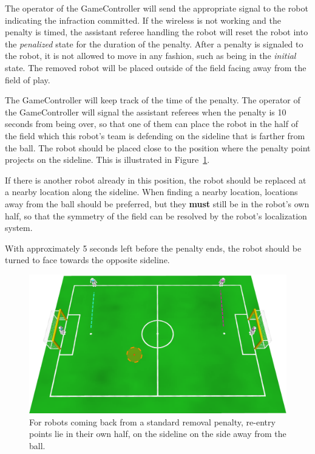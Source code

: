 \documentclass[12pt]{article}
\begin{document}
The operator of the GameController will send the appropriate signal to the robot indicating the infraction committed. If the wireless is not working and the penalty is timed, the assistant referee handling the robot will reset the robot into the \emph{penalized} state for the duration of the penalty. After a penalty is signaled to the robot, it is not allowed to move in any fashion, such as being in the \emph{initial} state. The removed robot will be placed outside of the field facing away from the field of play.

The GameController will keep track of the time of the penalty. The operator of the GameController will signal the assistant referees when the penalty is 10 seconds from being over, so that one of them can place the robot in the half of the field which this robot's team is defending on the sideline that is farther from the ball. The robot should be placed close to the position where the penalty point projects on the sideline. This is illustrated in Figure~\ref{fig:penalty_re-entry_points}. 

If there is another robot already in this position, the robot should be replaced at a nearby location along the sideline. When finding a nearby location, locations away from the ball should be preferred, but they \textbf{must} still be in the robot's own half, so that the symmetry of the field can be resolved by the robot's localization system.

With approximately 5 seconds left before the penalty ends, the robot should be turned to face towards the opposite sideline.

\begin{figure}[t]
\centerline{\includegraphics[width=\columnwidth]{figs/penalty_re-entry_points.pdf}}
\caption{For robots coming back from a standard removal penalty, re-entry points lie in their own half, on the sideline on the side away from the ball.}
\label{fig:penalty_re-entry_points}
\end{figure}
\end{document}
